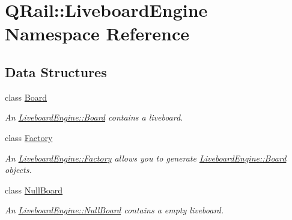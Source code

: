 \hypertarget{namespaceQRail_1_1LiveboardEngine}{}\section{Q\+Rail\+::Liveboard\+Engine Namespace Reference}
\label{namespaceQRail_1_1LiveboardEngine}
\subsection*{Data Structures}
\begin{DoxyCompactItemize}
\item 
class \mbox{\hyperlink{classQRail_1_1LiveboardEngine_1_1Board}{Board}}
\begin{DoxyCompactList}\small\item\em An \mbox{\hyperlink{classQRail_1_1LiveboardEngine_1_1Board}{Liveboard\+Engine\+::\+Board}} contains a liveboard. \end{DoxyCompactList}\item 
class \mbox{\hyperlink{classQRail_1_1LiveboardEngine_1_1Factory}{Factory}}
\begin{DoxyCompactList}\small\item\em An \mbox{\hyperlink{classQRail_1_1LiveboardEngine_1_1Factory}{Liveboard\+Engine\+::\+Factory}} allows you to generate \mbox{\hyperlink{classQRail_1_1LiveboardEngine_1_1Board}{Liveboard\+Engine\+::\+Board}} objects. \end{DoxyCompactList}\item 
class \mbox{\hyperlink{classQRail_1_1LiveboardEngine_1_1NullBoard}{Null\+Board}}
\begin{DoxyCompactList}\small\item\em An \mbox{\hyperlink{classQRail_1_1LiveboardEngine_1_1NullBoard}{Liveboard\+Engine\+::\+Null\+Board}} contains a empty liveboard. \end{DoxyCompactList}\end{DoxyCompactItemize}
